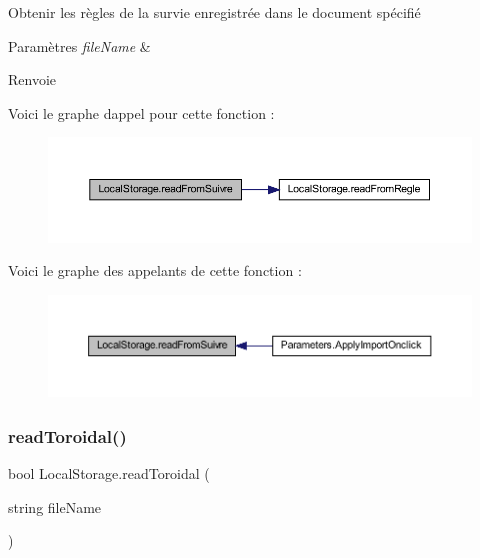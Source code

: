 Obtenir les règles de la survie enregistrée dans le document spécifié 


\begin{DoxyParams}{Paramètres}
{\em file\+Name} & \\
\hline
\end{DoxyParams}
\begin{DoxyReturn}{Renvoie}

\end{DoxyReturn}
Voici le graphe d\textquotesingle{}appel pour cette fonction \+:\nopagebreak
\begin{figure}[H]
\begin{center}
\leavevmode
\includegraphics[width=350pt]{class_local_storage_a0c0003569be45cff5fda794e42243c1e_cgraph}
\end{center}
\end{figure}
Voici le graphe des appelants de cette fonction \+:\nopagebreak
\begin{figure}[H]
\begin{center}
\leavevmode
\includegraphics[width=350pt]{class_local_storage_a0c0003569be45cff5fda794e42243c1e_icgraph}
\end{center}
\end{figure}
\mbox{\label{class_local_storage_a9197311a356432fa7a9480c69f42dd9c}} 
\subsubsection{\texorpdfstring{read\+Toroidal()}{readToroidal()}}
{\footnotesize\ttfamily bool Local\+Storage.\+read\+Toroidal (\begin{DoxyParamCaption}\item[{string}]{file\+Name }\end{DoxyParamCaption})\hspace{0.3cm}{\ttfamily [inline]}}

